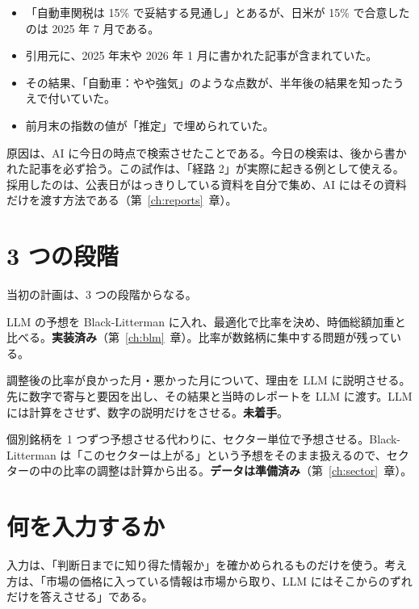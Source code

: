 \documentclass[xelatex,ja=standard,jafont=hiragino-pron,a4paper,10pt]{bxjsreport}
\newcommand{\chapref}[1]{第~\ref{#1}~章}
\begin{document}
\begin{itemize}
\item 「自動車関税は 15\% で妥結する見通し」とあるが、日米が 15\% で合意したのは 2025 年 7 月である。
\item 引用元に、2025 年末や 2026 年 1 月に書かれた記事が含まれていた。
\item その結果、「自動車：やや強気」のような点数が、半年後の結果を知ったうえで付いていた。
\item 前月末の指数の値が「推定」で埋められていた。
\end{itemize}

原因は、AI に今日の時点で検索させたことである。今日の検索は、後から書かれた記事を必ず拾う。この試作は、「経路 2」が実際に起きる例として使える。採用したのは、公表日がはっきりしている資料を自分で集め、AI にはその資料だけを渡す方法である（\chapref{ch:reports}）。

\section{3 つの段階}

当初の計画は、3 つの段階からなる。

\begin{description}[leftmargin=2em,style=nextline,itemsep=0.4em]
\item[段階 1：比率の調整] LLM の予想を Black-Litterman に入れ、最適化で比率を決め、時価総額加重と比べる。\textbf{実装済み}（\chapref{ch:blm}）。比率が数銘柄に集中する問題が残っている。
\item[段階 2：フィードバック] 調整後の比率が良かった月・悪かった月について、理由を LLM に説明させる。先に数字で寄与と要因を出し、その結果と当時のレポートを LLM に渡す。LLM には計算をさせず、数字の説明だけをさせる。\textbf{未着手}。
\item[段階 3：セクターの予想] 個別銘柄を 1 つずつ予想させる代わりに、セクター単位で予想させる。Black-Litterman は「このセクターは上がる」という予想をそのまま扱えるので、セクターの中の比率の調整は計算から出る。\textbf{データは準備済み}（\chapref{ch:sector}）。
\end{description}

\section{何を入力するか}

入力は、「判断日までに知り得た情報か」を確かめられるものだけを使う。考え方は、「市場の価格に入っている情報は市場から取り、LLM にはそこからのずれだけを答えさせる」である。
\end{document}

